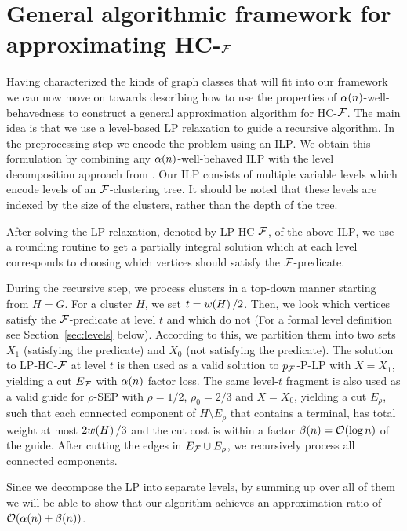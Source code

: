 \section{General algorithmic framework for approximating \textsc{HC-$\mathcal{F}$}}

Having characterized the kinds of graph classes that will fit into our framework we can now move on towards describing how to use the properties of $\alpha\mathopen{}\left( n \right)$-well-behavedness to construct a general approximation algorithm for \textsc{HC-$\mathcal{F}$}. The main idea is that we use a level-based \textsc{LP} relaxation to guide a recursive algorithm.
In the preprocessing step we encode the problem using an \textsc{ILP}. We obtain this formulation by combining any $\alpha\mathopen{}\left( n \right)$-well-behaved \textsc{ILP} with the level decomposition approach from \cite{ApproximateHierarchicalClusteringViaSparsestCutAndSpreadingMetrics}. Our \textsc{ILP} consists of multiple variable levels which encode levels of an $\mathcal{F}$-clustering tree. It should be noted that these levels are indexed by the size of the clusters, rather than the depth of the tree.

After solving the \textsc{LP} relaxation, denoted by \textsc{LP-HC-$\mathcal{F}$}, of the above \textsc{ILP}, we use a rounding routine to get a partially integral solution which at each level corresponds to choosing which vertices should satisfy the $\mathcal{F}$-predicate.

During the recursive step, we process clusters in a top-down manner starting from $H=G$. For a cluster $H$, we set $t=w\mathopen{}\left( H \right)/2$. Then, we look which vertices satisfy the $\mathcal{F}$-predicate at level $t$ and which do not (For a formal level definition see Section~\ref{sec:levels} below).
According to this, we partition them into two sets $X_1$ (satisfying the predicate) and $X_0$ (not satisfying the predicate). The solution to \textsc{LP-HC-$\mathcal{F}$} at level $t$ is then used as a valid solution to \textsc{$p_{\mathcal{F}}$-P-LP} with $X=X_1$, yielding a cut $E_{\mathcal{F}}$ with $\alpha\mathopen{}\left( n \right)$ factor loss. The same level-$t$ fragment is also used as a valid guide for \textsc{$\rho$-SEP} with $\rho=1/2$, $\rho_0=2/3$ and $X=X_0$, yielding a cut $E_{\rho}$, such that each connected component of $H\setminus E_{\rho}$ that contains a terminal, has total weight at most $2w\mathopen{}\left( H \right)/3$ and the cut cost is within a factor $\beta\mathopen{}\left( n \right)=\mathcal{O}\mathopen{}\left( \log n \right)$ of the guide. After cutting the edges in $E_{\mathcal{F}}\cup E_{\rho}$, we recursively process all connected components.

Since we decompose the \textsc{LP} into separate levels, by summing up over all of them we will be able to show that our algorithm achieves an approximation ratio of $\mathcal{O}\mathopen{}\left( \alpha\mathopen{}\left( n \right)+\beta\mathopen{}\left( n \right) \right)$.


